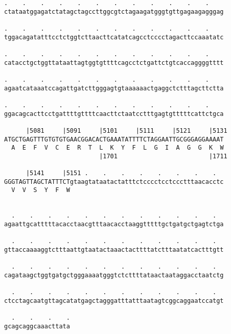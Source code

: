\documentclass{article}
\begin{document}
\begin{Verbatim}
.    .    .    .    .    .    .    .    .    .    .    .    
ctataatggagatctatagctagccttggcgtctagaagatgggtgttgagaagagggag
                                                            
.    .    .    .    .    .    .    .    .    .    .    .    
tggacagatatttcctctggtcttaacttcatatcagcctcccctagacttccaaatatc
                                                            
.    .    .    .    .    .    .    .    .    .    .    .    
catacctgctggttataattagtggtgttttcagcctctgattctgtcaccaggggtttt
                                                            
.    .    .    .    .    .    .    .    .    .    .    .    
agaatcataaatccagattgatcttgggagtgtaaaaaactgaggctctttagcttctta
                                                            
.    .    .    .    .    .    .    .    .    .    .    .    
ggacagcacttcctgattttgttttcaacttctaatcctttgagtgtttttcattctgca
                                                            
      |5081     |5091     |5101     |5111     |5121     |5131
ATGCTGAGTTTGTGTGTGAACGGACACTGAAATATTTTCTAGGAATTGCGGGAGGAAAAT
  A  E  F  V  C  E  R  T  L  K  Y  F  L  G  I  A  G  G  K  W
                          |1701                         |1711
  
      |5141     |5151 .    .    .    .    .    .    .    .  
GGGTAGTTAGCTATTTCTgtaagtataatactatttctcccctcctccctttaacacctc
  V  V  S  Y  F  W                                          
                                                            
  
  .    .    .    .    .    .    .    .    .    .    .    .  
agaattgcatttttacacctaacgtttaacacctaaggtttttgctgatgctgagtctga
                                                            
  .    .    .    .    .    .    .    .    .    .    .    .  
gttaccaaaaggtctttaattgtaatactaaactacttttatctttaatatcactttgtt
                                                            
  .    .    .    .    .    .    .    .    .    .    .    .  
cagataagctggtgatgctgggaaaatgggtctcttttataactaataggacctaatctg
                                                            
  .    .    .    .    .    .    .    .    .    .    .    .  
ctcctagcaatgttagcatatgagctagggatttatttaatagtcggcaggaatccatgt
                                                            
  .    .    .    .
gcagcaggcaaacttata
                  

\end{Verbatim}
\end{document}
